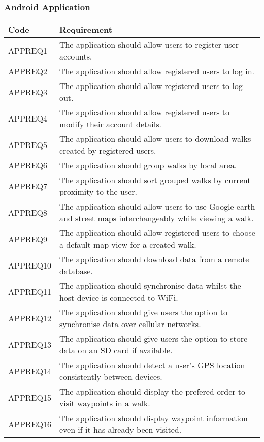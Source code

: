\documentclass[11pt,a4paper]{article}
\begin{document}
\subsubsection{Android Application}

\begin{longtable}{|p{2.5cm}p{13cm}|}
\hline
\textbf{Code} & \textbf{Requirement} \\
\hline
APPREQ1 & The application should allow users to register user accounts. \\ \hline
APPREQ2 & The application should allow registered users to log in. \\ \hline
APPREQ3 & The application should allow registered users to log out. \\ \hline
APPREQ4 & The application should allow registered users to modify their account details. \\ \hline
APPREQ5 & The application should allow users to download walks created by registered users. \\ \hline
APPREQ6 & The application should group walks by local area. \\ \hline
APPREQ7 & The application should sort grouped walks by current proximity to the user. \\ \hline
APPREQ8 & The application should allow users to use Google earth and street maps interchangeably while viewing a walk. \\ \hline
APPREQ9 & The application should allow registered users to choose a default map view for a created walk. \\ \hline
APPREQ10 & The application should download data from a remote database. \\ \hline
APPREQ11 & The application should synchronise data whilst the host device is connected to WiFi. \\ \hline
APPREQ12 & The application should give users the option to synchronise data over cellular networks. \\ \hline
APPREQ13 & The application should give users the option to store data on an SD card if available. \\ \hline
APPREQ14 & The application should detect a user's GPS location consistently between devices. \\ \hline
APPREQ15 & The application should display the prefered order to visit waypoints in a walk. \\ \hline
APPREQ16 & The application should display waypoint information even if it has already been visited. \\ \hline

\end{longtable}
\end{document}
